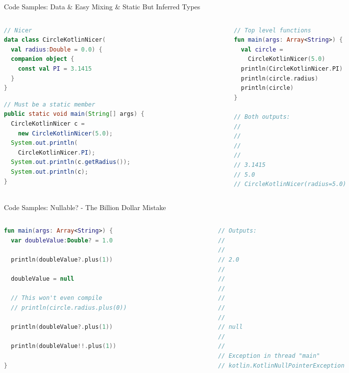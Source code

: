 \begin{frame}[fragile]{Code Samples: Data \& Easy Mixing \& Static But Inferred Types}
	\begin{columns}
		\begin{column}{0.5\textwidth}
\begin{lstlisting}[language=Kotlin,basicstyle=\ttfamily\tiny]
// Nicer
data class CircleKotlinNicer(
  val radius:Double = 0.0) {
  companion object {
    const val PI = 3.1415
  }
}
\end{lstlisting}
\begin{lstlisting}[language=Java,basicstyle=\ttfamily\tiny]
// Must be a static member
public static void main(String[] args) {
  CircleKotlinNicer c =
    new CircleKotlinNicer(5.0);
  System.out.println(
    CircleKotlinNicer.PI);
  System.out.println(c.getRadius());
  System.out.println(c);
}
\end{lstlisting}
		\end{column}
		\begin{column}{0.5\textwidth}
\begin{lstlisting}[language=Kotlin,basicstyle=\ttfamily\tiny]
// Top level functions
fun main(args: Array<String>) {
  val circle =
    CircleKotlinNicer(5.0)
  println(CircleKotlinNicer.PI)
  println(circle.radius)
  println(circle)
}

// Both outputs:
// 
// 
// 
//
// 3.1415
// 5.0
// CircleKotlinNicer(radius=5.0)
\end{lstlisting}
		\end{column}
	\end{columns}
\end{frame}

\begin{frame}[fragile]{Code Samples: Nullable? - The Billion Dollar Mistake}
	\begin{columns}
		\begin{column}{0.5\textwidth}
\begin{lstlisting}[language=Kotlin,basicstyle=\ttfamily\tiny]
fun main(args: Array<String>) {
  var doubleValue:Double? = 1.0

  println(doubleValue?.plus(1))

  doubleValue = null

  // This won't even compile
  // println(circle.radius.plus(0))

  println(doubleValue?.plus(1))

  println(doubleValue!!.plus(1))

}
\end{lstlisting}
		\end{column}
		\begin{column}{0.5\textwidth}
\begin{lstlisting}[language=Kotlin,basicstyle=\ttfamily\tiny]
// Outputs:
//
//
// 2.0
// 
// 
// 
// 
// 
//
// null
// 
//
// Exception in thread "main"
// kotlin.KotlinNullPointerException
\end{lstlisting}
		\end{column}
	\end{columns}
\end{frame}


